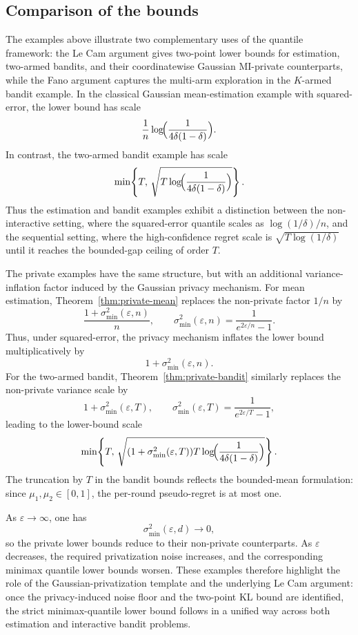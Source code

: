 \documentclass[journal]{IEEEtran}
\begin{document}
\subsection{Comparison of the bounds}
\label{sec:comparison}

The examples above illustrate two complementary uses of the quantile framework:
the Le Cam argument gives two-point lower bounds for estimation, two-armed
bandits, and their coordinatewise Gaussian MI-private counterparts, while the Fano argument captures
the multi-arm exploration in the \(K\)-armed bandit example. In the
classical Gaussian mean-estimation example with squared-error, the lower bound
has scale
\[
\frac{1}{n}
\log\!\Bigl(\frac{1}{4\delta(1-\delta)}\Bigr).
\]
In contrast, the two-armed bandit example has scale
\[
\min\!\left\{
T,\,
\sqrt{
T\log\!\Bigl(\frac{1}{4\delta(1-\delta)}\Bigr)
}
\right\}.
\]
Thus the estimation and bandit examples exhibit a distinction between the
non-interactive setting, where the squared-error quantile scales as
\(\log(1/\delta)/n\), and the sequential setting, where the high-confidence regret
scale is \(\sqrt{T\log(1/\delta)}\) until it reaches the bounded-gap ceiling of
order \(T\).

The private examples have the same structure, but with an additional
variance-inflation factor induced by the Gaussian privacy mechanism. For
mean estimation, Theorem~\ref{thm:private-mean} replaces the non-private
factor \(1/n\) by
\[
\frac{1+\sigma_{\min}^2(\varepsilon,n)}{n},
\qquad
\sigma_{\min}^2(\varepsilon,n)
=
\frac{1}{e^{2\varepsilon/n}-1}.
\]
Thus, under squared-error, the privacy mechanism inflates the lower bound multiplicatively
by
\[
1+\sigma_{\min}^2(\varepsilon,n).
\]
For the two-armed bandit, Theorem~\ref{thm:private-bandit} similarly replaces
the non-private variance scale by
\[
1+\sigma_{\min}^2(\varepsilon,T),
\qquad
\sigma_{\min}^2(\varepsilon,T)
=
\frac{1}{e^{2\varepsilon/T}-1},
\]
leading to the lower-bound scale
\[
\min\!\left\{
T,\,
\sqrt{
(1+\sigma_{\min}^2(\varepsilon,T))T
\log\!\Bigl(\frac{1}{4\delta(1-\delta)}\Bigr)
}
\right\}.
\]
The truncation by \(T\) in the bandit bounds reflects the bounded-mean
formulation: since \(\mu_1,\mu_2\in[0,1]\), the per-round pseudo-regret is at
most one.

As \(\varepsilon\to\infty\), one has
\[
\sigma_{\min}^2(\varepsilon,d)\to 0,
\]
so the private lower bounds reduce to their non-private counterparts. As
\(\varepsilon\) decreases, the required privatization noise increases, and the
corresponding minimax quantile lower bounds worsen. These examples therefore highlight the role of the Gaussian-privatization
template and the underlying Le Cam argument: once the
privacy-induced noise floor and the two-point KL bound are identified, the
strict minimax-quantile lower bound follows in a unified way across both
estimation and interactive bandit problems.
\end{document}
